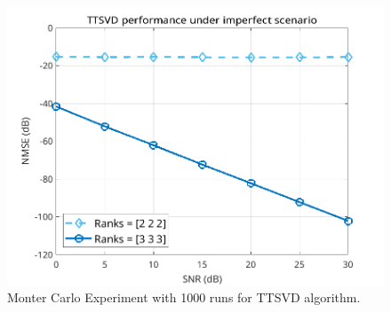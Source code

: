 \documentclass[a4paper,10pt]{article}
\begin{document}
    \begin{figure}[ht!]
        \centering 
        \includegraphics[width=0.75\linewidth]{figs/hw13.png} \par 
        \caption{Monter Carlo Experiment with 1000 runs for TTSVD algorithm.}
        \label{fig:hw13} 
    \end{figure}

%
%
\end{document}
